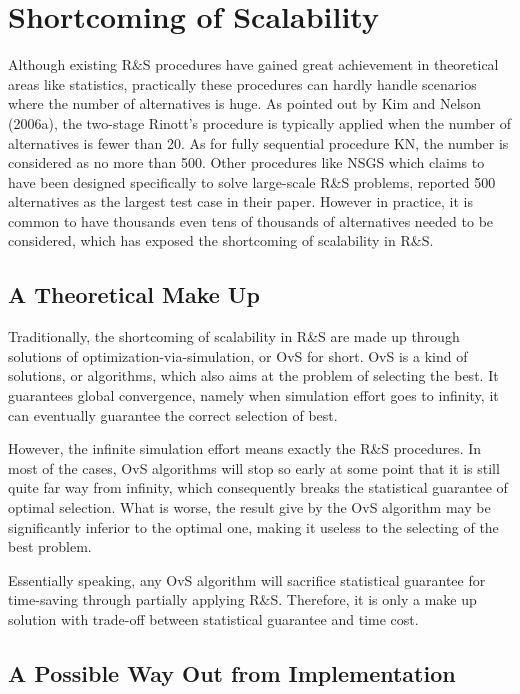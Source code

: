 \documentclass[12pt,a4paper]{report}
\begin{document}
\section{Shortcoming of Scalability}

Although existing R\&S procedures have gained great achievement in theoretical areas like statistics, practically these procedures can hardly handle scenarios where the number of alternatives is huge. As pointed out by Kim and Nelson (2006a), the two-stage Rinott’s procedure is typically applied when the number of alternatives is fewer than 20. As for fully sequential procedure KN, the number is considered as no more than 500. Other procedures like NSGS which claims to have been designed specifically to solve large-scale R\&S problems, reported 500 alternatives as the largest test case in their paper. However in practice, it is common to have thousands even tens of thousands of alternatives needed to be considered, which has exposed the shortcoming of scalability in R\&S.

\subsection{A Theoretical Make Up}

Traditionally, the shortcoming of scalability in R\&S are made up through solutions of optimization-via-simulation, or OvS for short. OvS is a kind of solutions, or algorithms, which also aims at the problem of selecting the best. It guarantees global convergence, namely when simulation effort goes to infinity, it can eventually guarantee the correct selection of best.

However, the infinite simulation effort means exactly the R\&S procedures. In most of the cases, OvS algorithms will stop so early at some point that it is still quite far way from infinity, which consequently breaks the statistical guarantee of optimal selection. What is worse, the result give by the OvS algorithm may be significantly inferior to the optimal one, making it useless to the selecting of the best problem. 

Essentially speaking, any OvS algorithm will sacrifice statistical guarantee for time-saving through partially applying R\&S. Therefore, it is only a make up solution with trade-off between statistical guarantee and time cost.

\subsection{A Possible Way Out from Implementation}
\end{document}
